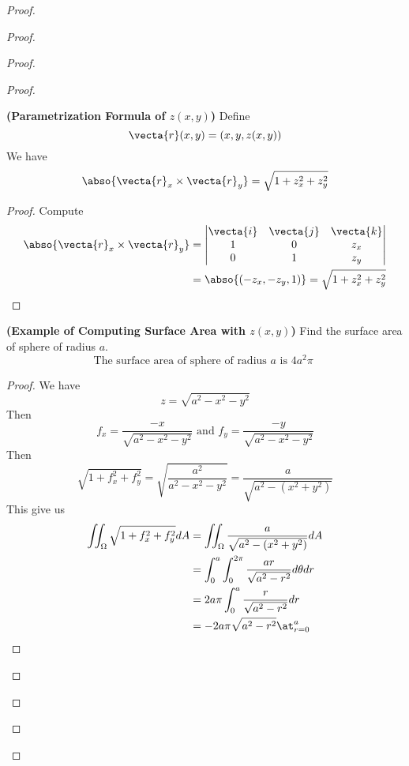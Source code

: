 \documentclass{report}
\begin{document}
\begin{proof}
\begin{proof}
\begin{proof}
\begin{proof}
\begin{theorem}
\label{10.1.3}
\textbf{(Parametrization Formula of $z(x,y)$)} Define 
\begin{equation*}
\vecta{r}(x,y)=(x,y,z(x,y))
\end{equation*}
We have
\begin{equation*}
\abso{\vecta{r}_x\times \vecta{r}_y}=\sqrt{1+z_x^2+z_y^2} 
\end{equation*}
\end{theorem}
\begin{proof}
Compute 
\begin{align*}
  \abso{\vecta{r}_x\times\vecta{r}_y}&=\begin{vmatrix}
  \vecta{i}&\vecta{j}&\vecta{k} \\
  1&0&z_x\\
  0&1&z_y
\end{vmatrix}\\
                                                              &=\abso{(-z_x,-z_y,1)}                                          =\sqrt{1+z_x^2+z_y^2} 
\end{align*}
\end{proof}
\begin{theorem}
\label{10.1.4}
\textbf{(Example of Computing Surface Area with $z(x,y)$)} Find the surface area of sphere of radius $a$. 
\begin{equation*}
\text{ The surface area of sphere of radius $a$ is  $4a^2\pi$ }
\end{equation*}
\end{theorem}
\begin{proof}
We have 
\begin{equation*}
z=\sqrt{a^2-x^2-y^2} 
\end{equation*}
Then 
\begin{equation*}
f_x=\frac{-x}{\sqrt{a^2-x^2-y^2} }\text{ and }f_y=\frac{-y}{\sqrt{a^2-x^2-y^2} }
\end{equation*}
Then 
\begin{equation*}
\sqrt{1+f_x^2+f_y^2}=\sqrt{\frac{a^2}{a^2-x^2-y^2}}=\frac{a}{\sqrt{a^2-(x^2+y^2)} }
\end{equation*}
This give us 
\begin{align*}
\iint_{\Omega} \sqrt{1+f_x^2+f_y^2}dA&=\iint_{\Omega}\frac{a}{\sqrt{a^2-(x^2+y^2)} }dA\\
&=\int_0^a\int_0^{2\pi} \frac{ar}{\sqrt{a^2-r^2} }d\theta dr\\
&=2a\pi \int_0^a \frac{r}{\sqrt{a^2-r^2} } dr\\
&=-2a\pi\sqrt{a^2-r^2}\at_{r=0}^a\\

\end{align*}
\end{proof}
\end{proof}
\end{proof}
\end{proof}
\end{proof}
\end{document}
